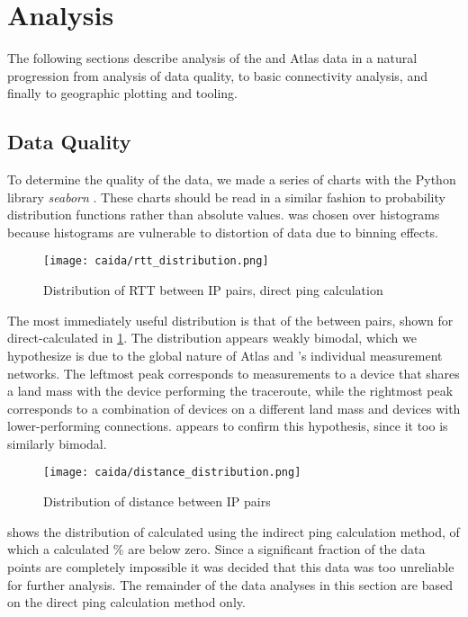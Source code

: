 \section{Analysis}\label{sec:caida_results}

The following sections describe analysis of the \caida and \ripe Atlas data in a natural progression from analysis of data quality, to basic connectivity analysis, and finally to geographic plotting and \gis tooling.

\subsection{Data Quality}

To determine the quality of the data, we made a series of \kde charts with the Python library \textit{seaborn} \cite{seaborn}. These charts should be read in a similar fashion to probability distribution functions rather than absolute values. \KDE was chosen over histograms because histograms are vulnerable to distortion of data due to binning effects.

\begin{figure}[h]
    \centering
    \texttt{[image: caida/rtt\_distribution.png]}
    \caption{Distribution of RTT between IP pairs, direct ping calculation}
    \label{fig:caida_rtt_distribution}
\end{figure}

The most immediately useful distribution is that of the \rtt between \ip pairs, shown for direct-calculated \rtts in \cref{fig:caida_rtt_distribution}. The distribution appears weakly bimodal, which we hypothesize is due to the global nature of \ripe Atlas and \caida's individual measurement networks. The leftmost peak corresponds to measurements to a device that shares a land mass with the device performing the traceroute, while the rightmost peak corresponds to a combination of devices on a different land mass and devices with lower-performing connections.  appears to confirm this hypothesis, since it too is similarly bimodal.

\begin{figure}[h]
    \centering
    \texttt{[image: caida/distance\_distribution.png]}
    \caption{Distribution of distance between IP pairs}
    \label{fig:caida_distance_distribution}
\end{figure}

  shows the distribution of \rtts calculated using the indirect ping calculation method, of which a calculated \% are below zero. Since a significant fraction of the data points are completely impossible it was decided that this data was too unreliable for further analysis. The remainder of the data analyses in this section are based on the direct ping calculation method only.

